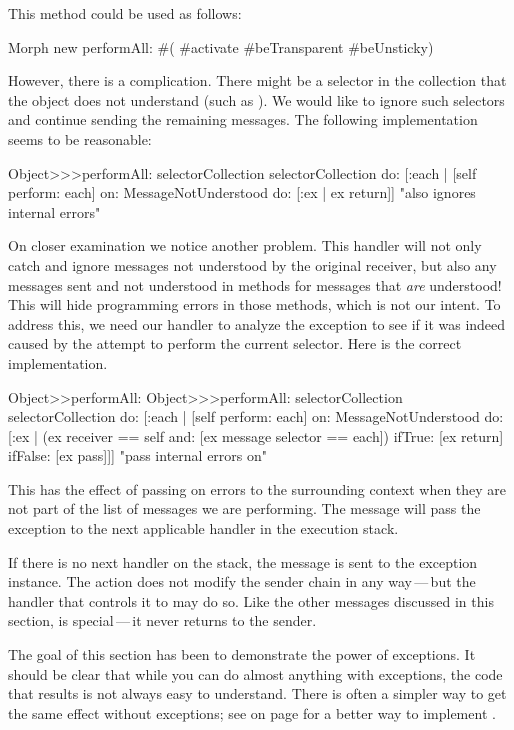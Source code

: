This method could be used as follows:
\begin{code}{}
Morph new performAll: #( #activate #beTransparent #beUnsticky)
\end{code}

However, there is a complication. There might be a selector in the collection that the object does not understand (such as ). We would like to ignore such selectors and continue sending the remaining messages. The following implementation seems to be reasonable:

\begin{code}{}
Object>>>performAll: selectorCollection 
	selectorCollection do: [:each |
		[self perform: each]
			on: MessageNotUnderstood
			do: [:ex | ex return]]    "also ignores internal errors"
\end{code}

On closer examination we notice another problem. This handler will not only catch and ignore messages not understood by the original receiver, but also any messages sent and not understood in methods for messages that \emph{are} understood! This will hide programming errors in those methods, which is not our intent.
To address this, we need our handler to analyze the exception to see if it was indeed caused by the attempt to perform the current selector.
Here is the correct implementation.
\begin{method}[objectPerformAll]{Object>>performAll:}
Object>>>performAll: selectorCollection 
	selectorCollection do: [:each | 
		[self perform: each] 
			on: MessageNotUnderstood 
			do: [:ex | (ex receiver == self and: [ex message selector == each]) 
				ifTrue: [ex return] 
				ifFalse: [ex pass]]]    "pass internal errors on"
\end{method}

This has the effect of passing on  errors to the surrounding context when they are not part of the list of messages we are performing. The  message will pass the exception to the next applicable handler in the execution stack.

If there is no next handler on the stack, the  message is sent to the exception instance. The  action does not modify the sender chain in any way\,---\,but the handler that controls it to may do so. Like the other messages discussed in this section,  is special\,---\,it never returns to the sender.

The goal of this section has been to demonstrate the power of exceptions.
It should be clear that while you can do almost anything with exceptions, the code
that results is not always easy to understand.   
There is often a simpler way to get the same effect without exceptions; see  on page \pageref{mth:simplerObjectPerfromAll} for a better way to implement .

